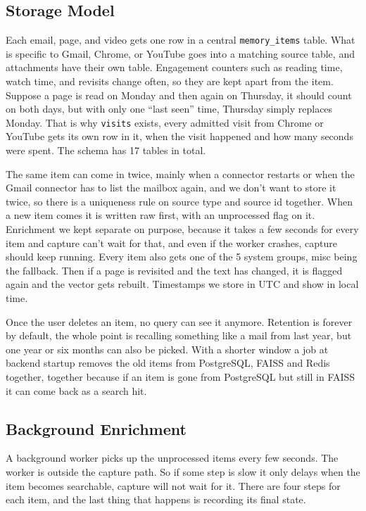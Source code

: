 \documentclass[conference]{IEEEtran}
\begin{document}
\subsection{Storage Model}
Each email, page, and video gets one row in a central \texttt{memory\_items} table. What is specific to Gmail, Chrome, or YouTube goes into a matching source table, and attachments have their own table. Engagement counters such as reading time, watch time, and revisits change often, so they are kept apart from the item. Suppose a page is read on Monday and then again on Thursday, it should count on both days, but with only one ``last seen'' time, Thursday simply replaces Monday. That is why \texttt{visits} exists, every admitted visit from Chrome or YouTube gets its own row in it, when the visit happened and how many seconds were spent. The schema has 17 tables in total.

The same item can come in twice, mainly when a connector restarts or when the Gmail connector has to list the mailbox again, and we don't want to store it twice, so there is a uniqueness rule on source type and source id together. When a new item comes it is written raw first, with an unprocessed flag on it. Enrichment we kept separate on purpose, because it takes a few seconds for every item and capture can't wait for that, and even if the worker crashes, capture should keep running. Every item also gets one of the 5 system groups, misc being the fallback. Then if a page is revisited and the text has changed, it is flagged again and the vector gets rebuilt. Timestamps we store in UTC and show in local time.

Once the user deletes an item, no query can see it anymore. Retention is forever by default, the whole point is recalling something like a mail from last year, but one year or six months can also be picked. With a shorter window a job at backend startup removes the old items from PostgreSQL, FAISS and Redis together, together because if an item is gone from PostgreSQL but still in FAISS it can come back as a search hit.

\subsection{Background Enrichment}
A background worker picks up the unprocessed items every few seconds. The worker is outside the capture path. So if some step is slow it only delays when the item becomes searchable, capture will not wait for it. There are four steps for each item, and the last thing that happens is recording its final state.
\end{document}
